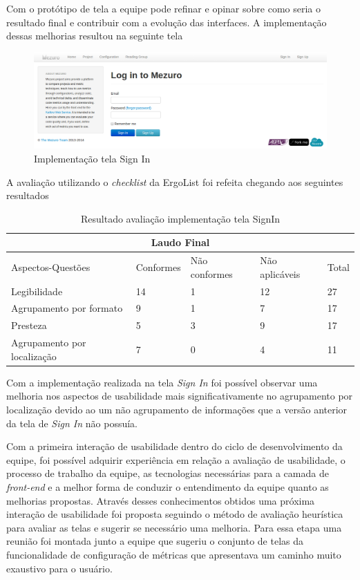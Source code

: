 Com o protótipo de tela a equipe pode refinar e opinar sobre como seria o resultado final e contribuir com a evolução das interfaces. A implementação dessas melhorias resultou na seguinte tela

\graphicspath{{figuras/}}
\begin{figure}[H]
\centering
\includegraphics[width=1.0\textwidth]{TelaSignIn}
\caption{Implementação tela Sign In}
\label{parallel-coordinate}
\end{figure}

A avaliação utilizando o \textit{checklist} da ErgoList foi refeita chegando aos seguintes resultados

\begin{table}[H]
\begin{tabular}{|l|l|l|l|l|}
\hline
\multicolumn{5}{|c|}{\textbf{Laudo Final}}                                       \\ \hline
Aspectos-Questões           & Conformes & Não conformes & Não aplicáveis & Total \\ \hline
Legibilidade                & 14        & 1             & 12             & 27    \\ \hline
Agrupamento por formato     & 9         & 1             & 7              & 17    \\ \hline
Presteza                    & 5         & 3             & 9              & 17    \\ \hline
Agrupamento por localização & 7         & 0             & 4              & 11    \\ \hline
\end{tabular}
\caption{Resultado avaliação implementação tela SignIn}
\end{table}

Com a implementação realizada na tela \textit{Sign In} foi possível observar uma melhoria nos aspectos de usabilidade mais significativamente no agrupamento por localização devido ao um não agrupamento de informações que a versão anterior da tela de \textit{Sign In} não possuía.

Com a primeira interação de usabilidade dentro do ciclo de desenvolvimento da equipe, foi possível adquirir experiência em relação a avaliação de usabilidade, o processo de trabalho da equipe, as tecnologias necessárias para a camada de \textit{front-end} e a melhor forma de conduzir o entendimento da equipe quanto as melhorias propostas. Através desses conhecimentos obtidos uma próxima interação de usabilidade foi proposta seguindo o método de avaliação heurística para avaliar as telas e sugerir se necessário uma melhoria. Para essa etapa uma reunião foi montada junto a equipe que sugeriu o conjunto de telas da funcionalidade de configuração de métricas que apresentava um caminho muito exaustivo para o usuário.

